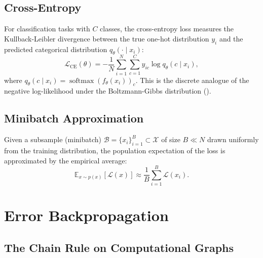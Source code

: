 \documentclass[11pt, oneside, openany]{book}
\DeclareMathOperator{\softmax}{softmax}
\begin{document}
\subsection{Cross-Entropy}
\label{sec:A.2.2}

For classification tasks with $C$ classes, the cross-entropy loss measures the Kullback-Leibler divergence between the true one-hot distribution $y_{i}$ and the predicted categorical distribution $q_{\theta}(\cdot \mid x_{i})$:
\begin{equation}
\label{eq:A.4}
\mathcal{L}_{\text{CE}}(\theta) = -\frac{1}{N} \sum_{i=1}^{N} \sum_{c=1}^{C} y_{ic} \log q_{\theta}(c \mid x_{i}),
\end{equation}
where $q_{\theta}(c \mid x_{i}) = \softmax(f_{\theta}(x_{i}))_{c}$. This is the discrete analogue of the negative log-likelihood under the Boltzmann-Gibbs distribution ().

\subsection{Minibatch Approximation}
\label{sec:A.2.3}

Given a subsample (minibatch) $\mathcal{B} = \{x_{i}\}_{i=1}^{B} \subset \mathcal{X}$ of size $B \ll N$ drawn uniformly from the training distribution, the population expectation of the loss is approximated by the empirical average:
\begin{equation}
\label{eq:A.5}
\mathbb{E}_{x \sim p(x)}[\mathcal{L}(x)] \approx \frac{1}{B} \sum_{i=1}^{B} \mathcal{L}(x_{i}).
\end{equation}

\section{Error Backpropagation}
\label{sec:A.3}

\subsection{The Chain Rule on Computational Graphs}
\label{sec:A.3.1}
\end{document}
